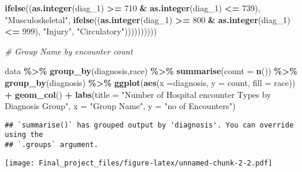 \documentclass[
]{article}
\newenvironment{Shaded}{\begin{snugshade}}{\end{snugshade}}
\newcommand{\AttributeTok}[1]{\textcolor[rgb]{0.13,0.29,0.53}{#1}}
\newcommand{\CommentTok}[1]{\textcolor[rgb]{0.56,0.35,0.01}{\textit{#1}}}
\newcommand{\DecValTok}[1]{\textcolor[rgb]{0.00,0.00,0.81}{#1}}
\newcommand{\FunctionTok}[1]{\textcolor[rgb]{0.13,0.29,0.53}{\textbf{#1}}}
\newcommand{\NormalTok}[1]{#1}
\newcommand{\SpecialCharTok}[1]{\textcolor[rgb]{0.81,0.36,0.00}{\textbf{#1}}}
\newcommand{\StringTok}[1]{\textcolor[rgb]{0.31,0.60,0.02}{#1}}
\begin{document}
\begin{Shaded}
\begin{Highlighting}[]
                                                          \FunctionTok{ifelse}\NormalTok{((}\FunctionTok{as.integer}\NormalTok{(diag\_1) }\SpecialCharTok{\textgreater{}=} \DecValTok{710} \SpecialCharTok{\&} \FunctionTok{as.integer}\NormalTok{(diag\_1) }\SpecialCharTok{\textless{}=} \DecValTok{739}\NormalTok{), }\StringTok{"Musculoskeletal"}\NormalTok{,          }
                                                                 \FunctionTok{ifelse}\NormalTok{((}\FunctionTok{as.integer}\NormalTok{(diag\_1) }\SpecialCharTok{\textgreater{}=} \DecValTok{800} \SpecialCharTok{\&} \FunctionTok{as.integer}\NormalTok{(diag\_1) }\SpecialCharTok{\textless{}=} \DecValTok{999}\NormalTok{), }\StringTok{"Injury"}\NormalTok{,                    }
                                                                        \StringTok{"Circulatory"}\NormalTok{))))))))))}


\CommentTok{\# Group Name by encounter count}

\NormalTok{data }\SpecialCharTok{\%\textgreater{}\%}  \FunctionTok{group\_by}\NormalTok{(diagnosis,race) }\SpecialCharTok{\%\textgreater{}\%} \FunctionTok{summarise}\NormalTok{(}\AttributeTok{count =} \FunctionTok{n}\NormalTok{()) }\SpecialCharTok{\%\textgreater{}\%} \FunctionTok{group\_by}\NormalTok{(diagnosis) }\SpecialCharTok{\%\textgreater{}\%}
  \FunctionTok{ggplot}\NormalTok{(}\FunctionTok{aes}\NormalTok{(}\AttributeTok{x =}\NormalTok{diagnosis, }\AttributeTok{y =}\NormalTok{ count, }\AttributeTok{fill =}\NormalTok{ race)) }\SpecialCharTok{+}
  \FunctionTok{geom\_col}\NormalTok{() }\SpecialCharTok{+}
   \FunctionTok{labs}\NormalTok{(}\AttributeTok{title =} \StringTok{"Number of Hospital encounter Types by Diagnosis Group"}\NormalTok{, }\AttributeTok{x =} \StringTok{"Group Name"}\NormalTok{, }\AttributeTok{y =} \StringTok{"no of Encounters"}\NormalTok{)}
\end{Highlighting}
\end{Shaded}

\begin{verbatim}
## `summarise()` has grouped output by 'diagnosis'. You can override using the
## `.groups` argument.
\end{verbatim}

\texttt{[image: Final\_project\_files/figure-latex/unnamed-chunk-2-2.pdf]}
\end{document}
